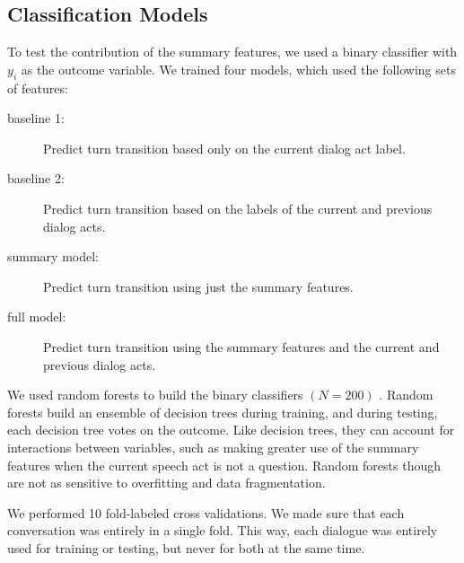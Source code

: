 \subsection{Classification Models}

    To test the contribution of the summary features, we used a binary classifier with
    $y_i$ as the outcome variable. We trained four models, which used the following sets of features:

    \begin{description}
        \item[baseline 1:] Predict turn transition based only on the current dialog act label.
        \item[baseline 2:] Predict turn transition based on the labels of the current and previous dialog acts.
        \item[summary model:] Predict turn transition using just the summary features.
        \item[full model:] Predict turn transition using the summary features and the current and previous dialog acts.
    \end{description}


We used random forests to build the binary classifiers $(N=200)$ \cite{Breiman01randomforests}. Random forests build an ensemble of decision trees during training, and during testing, each decision tree votes on the outcome.  Like decision trees, they can account for interactions between variables, such as making greater use of the summary features when the current speech act is not a question.  Random forests though are not as sensitive to overfitting and data fragmentation.

We performed 10 fold-labeled cross validations.  We made sure that each conversation was entirely in a single fold. This way, each dialogue was entirely used for training or testing, but never for both at the same time.

